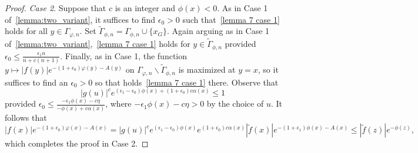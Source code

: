 \documentclass[10pt,reqno]{amsart}
\theoremstyle{plain}
\theoremstyle{definition}
\numberwithin{equation}{section}
\begin{document}
\begin{proof}
\emph{Case 2}. Suppose that $c$ is an integer and $\phi(x) < 0$. As in Case 1 of~\cref{lemma:two_variant}, it suffices to find $\epsilon_0 > 0$ such that~\cref{lemma 7 case 1} holds
for all $y \in \Gamma_{\varphi,n}$. Set $\widetilde{\Gamma}_{\phi,n} = \Gamma_{\phi,n} \cup \{ x_G \}$. 
Again arguing as in Case 1 of~\cref{lemma:two_variant},~\cref{lemma 7 case 1} holds for $y \in \widetilde{\Gamma}_{\phi,n}$ provided $\epsilon_0 \leq \frac{\epsilon_1 n}{n+c(n+1)}$. Finally, as in Case 1, the function $y \mapsto |f(y)|e^{-(1+\epsilon_0)\varphi(y)-A(y)}$ on $\Gamma_{\varphi,n}\backslash \widetilde{\Gamma}_{\phi,n}$ is maximized at $y=x$, so it suffices to find an $\epsilon_0 > 0$ so that holds~\cref{lemma 7 case 1} there.
Observe that
$$
|g(u)|^c e^{(\epsilon_1 - \epsilon_0) \phi(x) + (1+\epsilon_0) c \alpha(x)} \leq 1
$$
provided $\epsilon_0 \leq \frac{-\epsilon_1 \phi(x) - c\eta}{-\phi(x) +c\alpha(x)}$, where $-\epsilon_1 \phi(x) - c\eta > 0$ by the choice of $u$. 
It follows that
$$
|f(x)|e^{-(1+\epsilon_0)\varphi(x) - A(x)} = |g(u)|^c e^{(\epsilon_1 - \epsilon_0)\phi(x)} e^{(1+\epsilon_0)c\alpha(x)} |\tilde{f}(x)| e^{-(1+\epsilon_1)\phi(x) - A(x)} \leq |\tilde{f}(z)|e^{-\phi(z)},
$$
which completes the proof in Case 2.



\end{proof}
\end{document}

